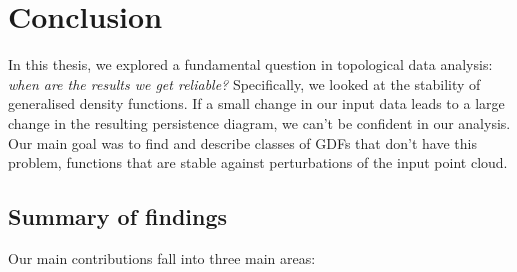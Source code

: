 \chapter{Conclusion}
\label{chap:conclusion}

In this thesis, we explored a fundamental question in topological data analysis:
\emph{when are the results we get reliable?} Specifically, we looked at the
stability of generalised density functions. If a small change in our input data
leads to a large change in the resulting persistence diagram, we can't be
confident in our analysis. Our main goal was to find and describe classes of
GDFs that don't have this problem, functions that are stable against
perturbations of the input point cloud.

\section{Summary of findings}

Our main contributions fall into three main areas:

